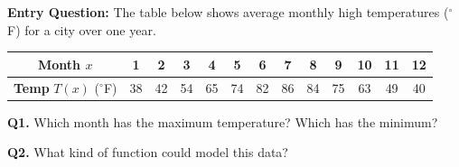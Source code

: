 \documentclass[10pt]{article}
\begin{document}
\vspace{0.08in}

\begin{hookbox}
\textbf{Entry Question:} The table below shows average monthly high
temperatures (${}^\circ$F) for a city over one year.

\vspace{4pt}
\begin{center}
\renewcommand{\arraystretch}{1.3}
\small
\begin{tabular}{|c|c|c|c|c|c|c|c|c|c|c|c|c|}
\hline
\textbf{Month} $x$ & 1 & 2 & 3 & 4 & 5 & 6 & 7 & 8 & 9 & 10 & 11 & 12 \\
\hline
\textbf{Temp} $T(x)$ (${}^\circ$F) & 38 & 42 & 54 & 65 & 74 & 82 & 86 & 84 & 75 & 63 & 49 & 40 \\
\hline
\end{tabular}
\end{center}

\vspace{6pt}
\textbf{Q1.} Which month has the maximum temperature? \underline{\hspace{2cm}}
\quad Which has the minimum? \underline{\hspace{2cm}}

\vspace{4pt}
\textbf{Q2.} What kind of function could model this data?
\end{hookbox}

\vspace{0.08in}
\end{document}

